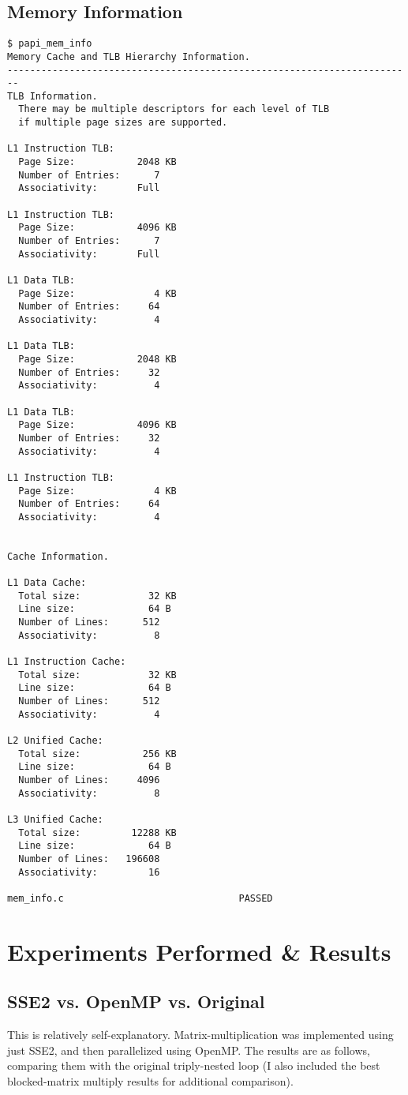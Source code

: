 \documentclass{article}
\begin{document}
\subsection{Memory Information}
\begin{lstlisting}
$ papi_mem_info
Memory Cache and TLB Hierarchy Information.
------------------------------------------------------------------------
TLB Information.
  There may be multiple descriptors for each level of TLB
  if multiple page sizes are supported.

L1 Instruction TLB:
  Page Size:           2048 KB
  Number of Entries:      7
  Associativity:       Full

L1 Instruction TLB:
  Page Size:           4096 KB
  Number of Entries:      7
  Associativity:       Full

L1 Data TLB:
  Page Size:              4 KB
  Number of Entries:     64
  Associativity:          4

L1 Data TLB:
  Page Size:           2048 KB
  Number of Entries:     32
  Associativity:          4

L1 Data TLB:
  Page Size:           4096 KB
  Number of Entries:     32
  Associativity:          4

L1 Instruction TLB:
  Page Size:              4 KB
  Number of Entries:     64
  Associativity:          4


Cache Information.

L1 Data Cache:
  Total size:            32 KB
  Line size:             64 B
  Number of Lines:      512
  Associativity:          8

L1 Instruction Cache:
  Total size:            32 KB
  Line size:             64 B
  Number of Lines:      512
  Associativity:          4

L2 Unified Cache:
  Total size:           256 KB
  Line size:             64 B
  Number of Lines:     4096
  Associativity:          8

L3 Unified Cache:
  Total size:         12288 KB
  Line size:             64 B
  Number of Lines:   196608
  Associativity:         16

mem_info.c                               PASSED
\end{lstlisting}

\newpage
\section{Experiments Performed \& Results}
\subsection{SSE2 vs. OpenMP vs. Original}
This is relatively self-explanatory. Matrix-multiplication was implemented using just SSE2, and then parallelized using OpenMP. The results are as follows, comparing them with the original triply-nested loop (I also included the best blocked-matrix multiply results for additional comparison).\\
\end{document}
